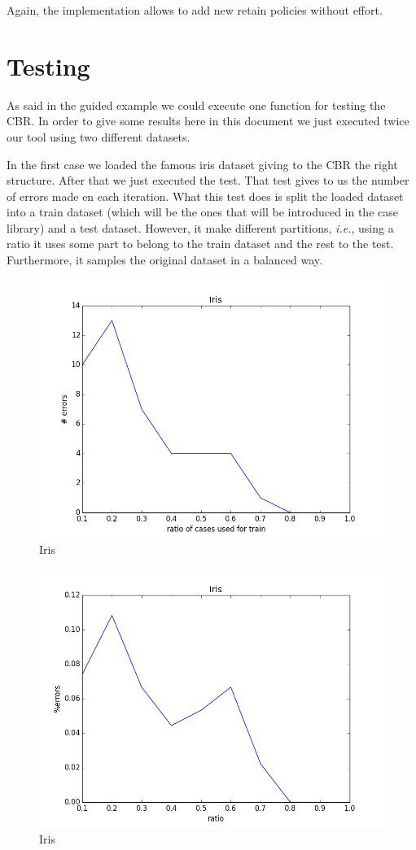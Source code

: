 \documentclass[11pt]{article}
\begin{document}
Again, the implementation allows to add new retain policies without effort.

\section{Testing}

As said in the guided example we could execute one function for testing the CBR. In order to give some results here in  this document we just executed twice our tool using two different datasets.

In the first case we loaded the famous iris dataset giving to the CBR the right structure. After that we just executed the test. That test gives to us the number of errors made en each iteration. What this test does is split the loaded dataset into a train dataset (which will be the ones that will be introduced in the case library) and a test dataset. However, it make different partitions, \emph{i.e.}, using a ratio it uses some part to belong to the train dataset and the rest to the test. Furthermore, it samples the original dataset in a balanced way.

\begin{figure}[htb]
    \center
    \includegraphics[width=0.7\linewidth]{images/iris}
    \caption{Iris}
    \label{fig:iris}
\end{figure}

\begin{figure}[htb]
    \center
    \includegraphics[width=0.7\linewidth]{images/iris_p_bo}
    \caption{Iris}
    \label{fig:irisp}
\end{figure}
\end{document}
